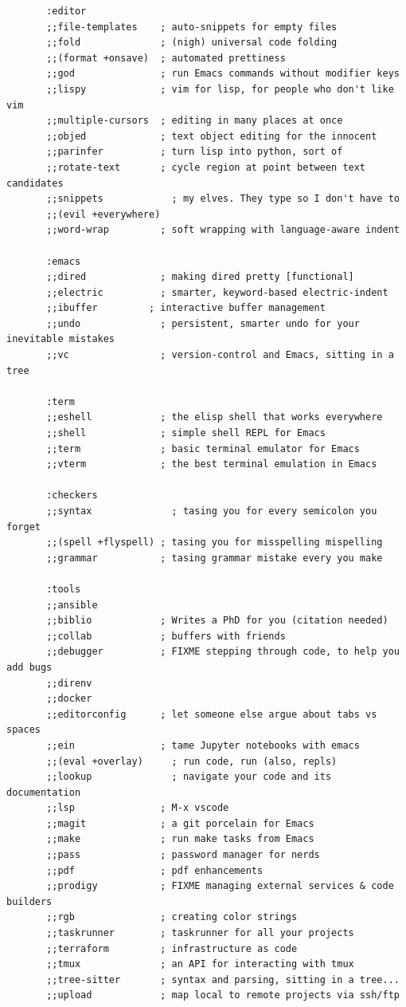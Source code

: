 \documentclass[11pt]{article}
\begin{document}
\begin{verbatim}
       :editor
       ;;file-templates    ; auto-snippets for empty files
       ;;fold              ; (nigh) universal code folding
       ;;(format +onsave)  ; automated prettiness
       ;;god               ; run Emacs commands without modifier keys
       ;;lispy             ; vim for lisp, for people who don't like vim
       ;;multiple-cursors  ; editing in many places at once
       ;;objed             ; text object editing for the innocent
       ;;parinfer          ; turn lisp into python, sort of
       ;;rotate-text       ; cycle region at point between text candidates
       ;;snippets            ; my elves. They type so I don't have to
       ;;(evil +everywhere)
       ;;word-wrap         ; soft wrapping with language-aware indent

       :emacs
       ;;dired             ; making dired pretty [functional]
       ;;electric          ; smarter, keyword-based electric-indent
       ;;ibuffer         ; interactive buffer management
       ;;undo              ; persistent, smarter undo for your inevitable mistakes
       ;;vc                ; version-control and Emacs, sitting in a tree

       :term
       ;;eshell            ; the elisp shell that works everywhere
       ;;shell             ; simple shell REPL for Emacs
       ;;term              ; basic terminal emulator for Emacs
       ;;vterm             ; the best terminal emulation in Emacs

       :checkers
       ;;syntax              ; tasing you for every semicolon you forget
       ;;(spell +flyspell) ; tasing you for misspelling mispelling
       ;;grammar           ; tasing grammar mistake every you make

       :tools
       ;;ansible
       ;;biblio            ; Writes a PhD for you (citation needed)
       ;;collab            ; buffers with friends
       ;;debugger          ; FIXME stepping through code, to help you add bugs
       ;;direnv
       ;;docker
       ;;editorconfig      ; let someone else argue about tabs vs spaces
       ;;ein               ; tame Jupyter notebooks with emacs
       ;;(eval +overlay)     ; run code, run (also, repls)
       ;;lookup              ; navigate your code and its documentation
       ;;lsp               ; M-x vscode
       ;;magit             ; a git porcelain for Emacs
       ;;make              ; run make tasks from Emacs
       ;;pass              ; password manager for nerds
       ;;pdf               ; pdf enhancements
       ;;prodigy           ; FIXME managing external services & code builders
       ;;rgb               ; creating color strings
       ;;taskrunner        ; taskrunner for all your projects
       ;;terraform         ; infrastructure as code
       ;;tmux              ; an API for interacting with tmux
       ;;tree-sitter       ; syntax and parsing, sitting in a tree...
       ;;upload            ; map local to remote projects via ssh/ftp


\end{verbatim}
\end{document}
